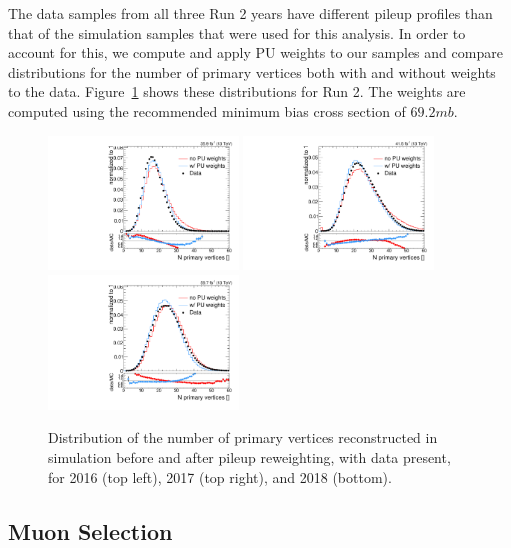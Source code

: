 The data samples from all three Run 2 years have different pileup profiles than that of the simulation samples that were used for this analysis.
In order to account for this, we compute and apply PU weights to our samples and compare distributions for the number of primary vertices both with and without weights to the data.
Figure~\ref{fig:PUreweight} shows these distributions for Run 2.
The weights are computed using the recommended minimum bias cross section of $69.2\unit{mb}$. %

\begin{figure}[htbp]
  \centering
  \includegraphics[width=0.45\textwidth]{fig/eventSelection/PUrewN_0_2016_nVert.pdf}
  \includegraphics[width=0.45\textwidth]{fig/eventSelection/PUrewN_0_2017_nVert.pdf}\\
  \includegraphics[width=0.45\textwidth]{fig/eventSelection/PUrewN_0_2018_nVert.pdf}
  \caption{
    Distribution of the number of primary vertices reconstructed in simulation before and after pileup reweighting, with data present, for 2016 (top left), 2017 (top right), and 2018 (bottom).
  }
  \label{fig:PUreweight}
\end{figure}

\subsection{Muon Selection}
\label{subsec:muonSelect}

